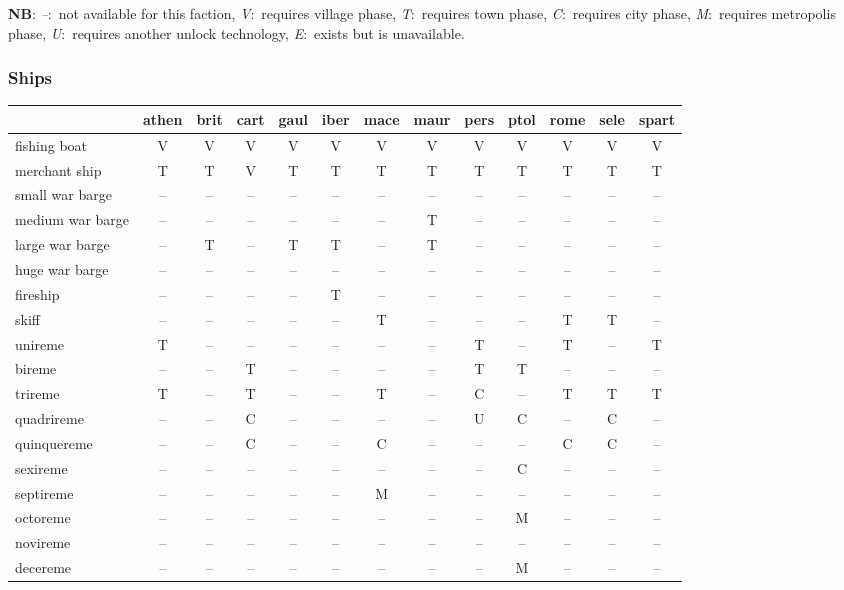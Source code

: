 \documentclass{article}
\newcommand{\legenda}{
\textbf{NB}:
\emph{--}:~not available for this faction, 
\emph{V}:~requires village phase, 
\emph{T}:~requires town phase, 
\emph{C}:~requires city phase, 
\emph{M}:~requires metropolis phase, 
\emph{U}:~requires another unlock technology, 
\emph{E}:~exists but is unavailable.
}
\begin{document}
\legenda


\clearpage
\subsubsection{Ships}
\begin{tabular}{l|cccc|cccc|cccc}
 & athen & brit & cart & gaul & iber & mace & maur & pers & ptol & rome & sele & spart \\
\hline
fishing boat      & V  & V  & V  & V  & V  & V  & V  & V  & V  & V  & V  & V  \\
merchant ship     & T  & T  & V  & T  & T  & T  & T  & T  & T  & T  & T  & T  \\
small war barge   & -- & -- & -- & -- & -- & -- & -- & -- & -- & -- & -- & -- \\
medium war barge  & -- & -- & -- & -- & -- & -- & T  & -- & -- & -- & -- & -- \\
large war barge   & -- & T  & -- & T  & T  & -- & T  & -- & -- & -- & -- & -- \\
huge war barge    & -- & -- & -- & -- & -- & -- & -- & -- & -- & -- & -- & -- \\
fireship          & -- & -- & -- & -- & T  & -- & -- & -- & -- & -- & -- & -- \\
skiff             & -- & -- & -- & -- & -- & T  & -- & -- & -- & T  & T  & -- \\
unireme           & T  & -- & -- & -- & -- & -- & -- & T  & -- & T  & -- & T  \\
bireme            & -- & -- & T  & -- & -- & -- & -- & T  & T  & -- & -- & -- \\
trireme           & T  & -- & T  & -- & -- & T  & -- & C  & -- & T  & T  & T  \\
quadrireme        & -- & -- & C  & -- & -- & -- & -- & U  & C  & -- & C  & -- \\
quinquereme       & -- & -- & C  & -- & -- & C  & -- & -- & -- & C  & C  & -- \\
sexireme          & -- & -- & -- & -- & -- & -- & -- & -- & C  & -- & -- & -- \\
septireme         & -- & -- & -- & -- & -- & M  & -- & -- & -- & -- & -- & -- \\
octoreme          & -- & -- & -- & -- & -- & -- & -- & -- & M  & -- & -- & -- \\
novireme          & -- & -- & -- & -- & -- & -- & -- & -- & -- & -- & -- & -- \\
decereme          & -- & -- & -- & -- & -- & -- & -- & -- & M  & -- & -- & -- \\
\end{tabular}
\end{document}
